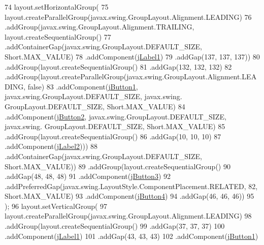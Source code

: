 \begin{DoxyCode}
74         layout.setHorizontalGroup(
75             layout.createParallelGroup(javax.swing.GroupLayout.Alignment.LEADING)
76             .addGroup(javax.swing.GroupLayout.Alignment.TRAILING, layout.createSequentialGroup()
77                 .addContainerGap(javax.swing.GroupLayout.DEFAULT\_SIZE, Short.MAX\_VALUE)
78                 .addComponent(\mbox{\hyperlink{class_interfaz_package_1_1_interfaz_cliente_a566a82ef3d269cafc1ea835fddd6a92a}{jLabel1}})
79                 .addGap(137, 137, 137))
80             .addGroup(layout.createSequentialGroup()
81                 .addGap(132, 132, 132)
82                 .addGroup(layout.createParallelGroup(javax.swing.GroupLayout.Alignment.LEADING, \textcolor{keyword}{false})
83                     .addComponent(\mbox{\hyperlink{class_interfaz_package_1_1_interfaz_cliente_a3734b48adc59c34c0adb8eb82178f408}{jButton1}}, javax.swing.GroupLayout.DEFAULT\_SIZE, javax.swing.
      GroupLayout.DEFAULT\_SIZE, Short.MAX\_VALUE)
84                     .addComponent(\mbox{\hyperlink{class_interfaz_package_1_1_interfaz_cliente_a0196e2e1cfcbbbc8861c08f6a0a37ae4}{jButton2}}, javax.swing.GroupLayout.DEFAULT\_SIZE, javax.swing.
      GroupLayout.DEFAULT\_SIZE, Short.MAX\_VALUE)
85                     .addGroup(layout.createSequentialGroup()
86                         .addGap(10, 10, 10)
87                         .addComponent(\mbox{\hyperlink{class_interfaz_package_1_1_interfaz_cliente_adddf6bbdd3ebab836af4f159294fd8ff}{jLabel2}})))
88                 .addContainerGap(javax.swing.GroupLayout.DEFAULT\_SIZE, Short.MAX\_VALUE))
89             .addGroup(layout.createSequentialGroup()
90                 .addGap(48, 48, 48)
91                 .addComponent(\mbox{\hyperlink{class_interfaz_package_1_1_interfaz_cliente_a25b735a55e8862dffce033dda1112430}{jButton3}})
92                 .addPreferredGap(javax.swing.LayoutStyle.ComponentPlacement.RELATED, 82, Short.MAX\_VALUE)
93                 .addComponent(\mbox{\hyperlink{class_interfaz_package_1_1_interfaz_cliente_a724801e1312c508ba148b8928739811e}{jButton4}})
94                 .addGap(46, 46, 46))
95         );
96         layout.setVerticalGroup(
97             layout.createParallelGroup(javax.swing.GroupLayout.Alignment.LEADING)
98             .addGroup(layout.createSequentialGroup()
99                 .addGap(37, 37, 37)
100                 .addComponent(\mbox{\hyperlink{class_interfaz_package_1_1_interfaz_cliente_a566a82ef3d269cafc1ea835fddd6a92a}{jLabel1}})
101                 .addGap(43, 43, 43)
102                 .addComponent(\mbox{\hyperlink{class_interfaz_package_1_1_interfaz_cliente_a3734b48adc59c34c0adb8eb82178f408}{jButton1}})

\end{DoxyCode}
